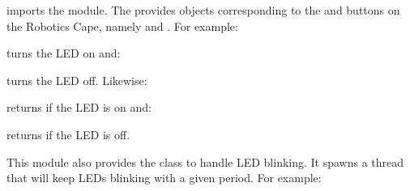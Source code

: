 \documentclass[letterpaper,10pt,english]{sphinxmanual}
\begin{document}
imports the module. The {\hyperref[\detokenize{index:rcpy-led}]{}} provides objects corresponding
to the  and  buttons on the Robotics Cape, namely
{\hyperref[\detokenize{index:rcpy.led.red}]{}} and {\hyperref[\detokenize{index:rcpy.led.green}]{}}. For example:

\begin{sphinxVerbatim}[commandchars=\\\{\}]
\end{sphinxVerbatim}

turns the  LED on and:

\begin{sphinxVerbatim}[commandchars=\\\{\}]
\end{sphinxVerbatim}

turns the  LED off. Likewise:

\begin{sphinxVerbatim}[commandchars=\\\{\}]
\end{sphinxVerbatim}

returns  if the  LED is on and:

\begin{sphinxVerbatim}[commandchars=\\\{\}]
\end{sphinxVerbatim}

returns  if the  LED is off.

This module also provides the class {\hyperref[\detokenize{index:rcpy.led.Blink}]{}} to
handle LED blinking. It spawns a thread that will keep LEDs blinking
with a given period. For example:

\begin{sphinxVerbatim}[commandchars=\\\{\}]
   
\end{sphinxVerbatim}
\end{document}
